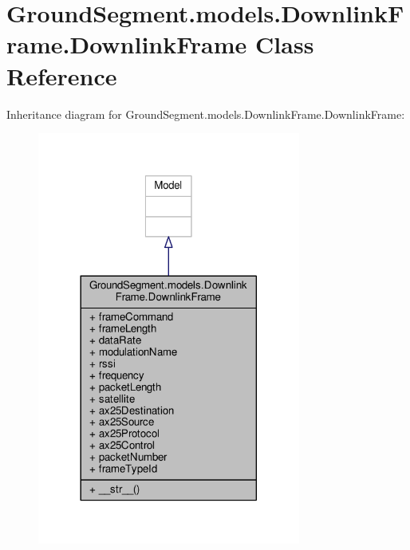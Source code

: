 \hypertarget{class_ground_segment_1_1models_1_1_downlink_frame_1_1_downlink_frame}{}\section{Ground\+Segment.\+models.\+Downlink\+Frame.\+Downlink\+Frame Class Reference}
\label{class_ground_segment_1_1models_1_1_downlink_frame_1_1_downlink_frame}


Inheritance diagram for Ground\+Segment.\+models.\+Downlink\+Frame.\+Downlink\+Frame\+:\nopagebreak
\begin{figure}[H]
\begin{center}
\leavevmode
\includegraphics[width=245pt]{class_ground_segment_1_1models_1_1_downlink_frame_1_1_downlink_frame__inherit__graph}
\end{center}
\end{figure}


